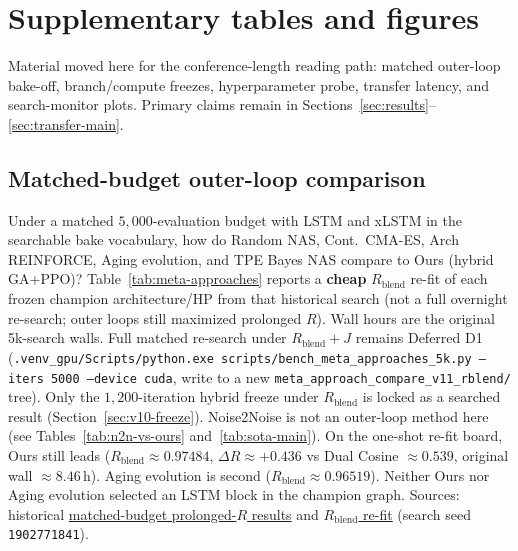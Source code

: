 \section{Supplementary tables and figures}
\label{app:supplement}

Material moved here for the conference-length reading path:
matched outer-loop bake-off, branch/compute freezes, hyperparameter probe, transfer latency, and search-monitor plots.
Primary claims remain in Sections~\ref{sec:results}--\ref{sec:transfer-main}.

\subsection{Matched-budget outer-loop comparison}
\label{sec:meta-approaches-results}

Under a matched $5{,}000$-evaluation budget with LSTM and xLSTM in the searchable bake vocabulary, how do Random NAS, Cont.\ CMA-ES, Arch REINFORCE, Aging evolution, and TPE Bayes NAS compare to Ours (hybrid GA+PPO)?
Table~\ref{tab:meta-approaches} reports a \textbf{cheap} $R_{\mathrm{blend}}$ re-fit of each frozen champion architecture/HP from that historical search
(not a full overnight re-search; outer loops still maximized prolonged $R$).
Wall hours are the original 5k-search walls.
Full matched re-search under $R_{\mathrm{blend}}{+}J$ remains Deferred D1
(\texttt{.venv\_gpu/Scripts/python.exe scripts/bench\_meta\_approaches\_5k.py --iters 5000 --device cuda}, write to a new \texttt{meta\_approach\_compare\_v11\_rblend/} tree).
Only the $1{,}200$-iteration hybrid freeze under $R_{\mathrm{blend}}$ is locked as a searched result (Section~\ref{sec:v10-freeze}).
Noise2Noise is not an outer-loop method here (see Tables~\ref{tab:n2n-vs-ours} and~\ref{tab:sota-main}).
On the one-shot re-fit board, Ours still leads ($R_{\mathrm{blend}}{\approx}0.97484$, $\Delta R{\approx}{+}0.436$ vs Dual Cosine ${\approx}0.539$, original wall ${\approx}8.46$\,h). Aging evolution is second ($R_{\mathrm{blend}}{\approx}0.96519$).
Neither Ours nor Aging evolution selected an LSTM block in the champion graph.
Sources: historical
\href{https://github.com/reeldemo/denoise-opt-meta/blob/master/paper/Unsupervised_Wavetable_Seam_Artifact_Repair_via_Hybrid_GA-PPO_Meta-Search_v11/figures/meta_approach_compare.json}{matched-budget prolonged-$R$ results}
and
\href{https://github.com/reeldemo/denoise-opt-meta/blob/master/paper/Unsupervised_Wavetable_Seam_Artifact_Repair_via_Hybrid_GA-PPO_Meta-Search_v11/figures/meta_approach_compare_rblend_rescore.json}{$R_{\mathrm{blend}}$ re-fit}
(search seed \texttt{1902771841}).

